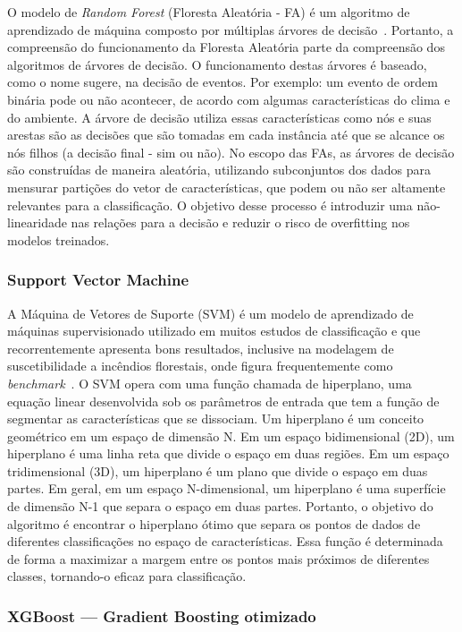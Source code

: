 \documentclass[tcc2]{uftex}
\begin{document}
O modelo de \textit{Random Forest} (Floresta Aleatória - FA) é um algoritmo de aprendizado de máquina composto por múltiplas árvores de decisão~\cite{breiman2001random}. Portanto, a compreensão do funcionamento da Floresta Aleatória parte da compreensão dos algoritmos de árvores de decisão. O funcionamento destas árvores é baseado, como o nome sugere, na decisão de eventos. Por exemplo: um evento de ordem binária pode ou não acontecer, de acordo com algumas características do clima e do ambiente. A árvore de decisão utiliza essas características como nós e suas arestas são as decisões que são tomadas em cada instância até que se alcance os nós filhos (a decisão final - sim ou não). No escopo das FAs, as árvores de decisão são construídas de maneira aleatória, utilizando subconjuntos dos dados para mensurar partições do vetor de características, que podem ou não ser altamente relevantes para a classificação. O objetivo desse processo é introduzir uma não-linearidade nas relações para a decisão e reduzir o risco de overfitting nos modelos treinados.

\subsubsection{Support Vector Machine}

A Máquina de Vetores de Suporte (SVM) é um modelo de aprendizado de máquinas supervisionado utilizado em muitos estudos de classificação e que recorrentemente apresenta bons resultados, inclusive na modelagem de suscetibilidade a incêndios florestais, onde figura frequentemente como \emph{benchmark}~\cite{tienbui2016tropical,kalantar2020forest}. O SVM opera com uma função chamada de hiperplano, uma equação linear desenvolvida sob os parâmetros de entrada que tem a função de segmentar as características que se dissociam. Um hiperplano é um conceito geométrico em um espaço de dimensão N. Em um espaço bidimensional (2D), um hiperplano é uma linha reta que divide o espaço em duas regiões. Em um espaço tridimensional (3D), um hiperplano é um plano que divide o espaço em duas partes. Em geral, em um espaço N-dimensional, um hiperplano é uma superfície de dimensão N-1 que separa o espaço em duas partes. Portanto, o objetivo do algoritmo é encontrar o hiperplano ótimo que separa os pontos de dados de diferentes classificações no espaço de características. Essa função é determinada de forma a maximizar a margem entre os pontos mais próximos de diferentes classes, tornando-o eficaz para classificação.

\subsubsection{XGBoost --- Gradient Boosting otimizado}
\label{subsec:fund_xgboost}
\end{document}
